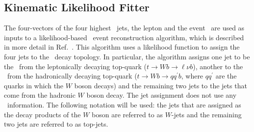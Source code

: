 \documentclass[letterpaper,12pt]{article}
\begin{document}
\subsection{Kinematic Likelihood Fitter}
\label{KLFitter}
The four-vectors of the four highest \pt\ jets, the lepton and the
event \MET\ are used as inputs to a likelihood-based \ttbar\ event
reconstruction algorithm, which is described in more detail in
Ref.~\cite{ERDMANN201418}. This algorithm uses a likelihood function
to assign the four jets to the \ttbar\ decay topology. In particular,
the algorithm assigns one jet to be the \bjet\ from the leptonically
decaying top-quark ($t\to Wb \to \ell \nu b$), another to the \bjet\
from the hadronically decaying top-quark ($t\to Wb \to qq^\prime b$,
where $qq^\prime$ are the quarks in which the $W$ boson decays) and
the remaining two jets to the jets that come from the hadronic $W$
boson decay. The jet assignment does not use any \btagging\ information.
The following notation will be used: the jets that are
assigned as the decay products of the $W$ boson are referred to as
$W$-jets and the remaining two jets are referred to as top-jets.
\end{document}
